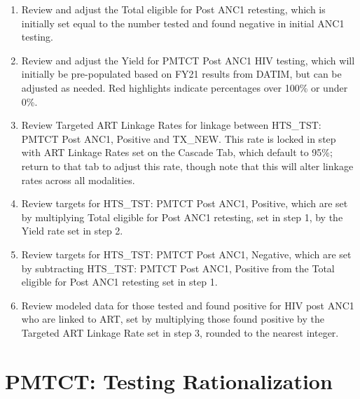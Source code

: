 \documentclass[
  openany]{book}
\begin{document}
\begin{enumerate}
\def\labelenumi{\arabic{enumi}.}
\item
  Review and adjust the Total eligible for Post ANC1 retesting, which
  is initially set equal to the number tested and found negative in
  initial ANC1 testing.
\item
  Review and adjust the Yield for PMTCT Post ANC1 HIV testing, which
  will initially be pre-populated based on FY21 results from DATIM,
  but can be adjusted as needed. Red highlights indicate percentages
  over 100\% or under 0\%.
\item
  Review Targeted ART Linkage Rates for linkage between HTS\_TST: PMTCT
  Post ANC1, Positive and TX\_NEW. This rate is locked in step with ART
  Linkage Rates set on the Cascade Tab, which default to 95\%; return
  to that tab to adjust this rate, though note that this will alter
  linkage rates across all modalities.
\item
  Review targets for HTS\_TST: PMTCT Post ANC1, Positive, which are set
  by multiplying Total eligible for Post ANC1 retesting, set in step
  1, by the Yield rate set in step 2.
\item
  Review targets for HTS\_TST: PMTCT Post ANC1, Negative, which are set
  by subtracting HTS\_TST: PMTCT Post ANC1, Positive from the Total
  eligible for Post ANC1 retesting set in step 1.
\item
  Review modeled data for those tested and found positive for HIV post
  ANC1 who are linked to ART, set by multiplying those found positive
  by the Targeted ART Linkage Rate set in step 3, rounded to the
  nearest integer.\textbf{\hfill\break
  }
\end{enumerate}

\hypertarget{pmtct-testing-rationalization}{%
\section{PMTCT: Testing Rationalization}\label{pmtct-testing-rationalization}}
\end{document}
